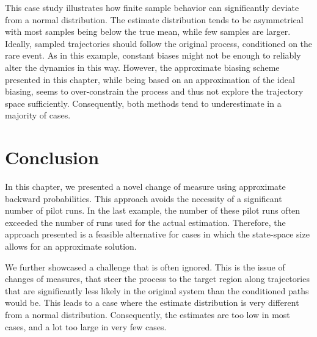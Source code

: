 This case study illustrates how finite sample behavior can significantly deviate from a normal distribution.
The estimate distribution tends to be asymmetrical with most samples being below the true mean, while few samples are larger.
Ideally, sampled trajectories should follow the original process, conditioned on the rare event.
As in this example, constant biases might not be enough to reliably alter the dynamics in this way.
However, the approximate biasing scheme presented in this chapter, while being based on an approximation of the ideal biasing, seems to over-constrain the process and thus not explore the trajectory space sufficiently.
Consequently, both methods tend to underestimate in a majority of cases.

\section{Conclusion}
In this chapter, we presented a novel change of measure using approximate backward probabilities.
This approach avoids the necessity of a significant number of pilot runs.
In the last example, the number of these pilot runs often exceeded the number of runs used for the actual estimation.
Therefore, the approach presented is a feasible alternative for cases in which the state-space size allows for an approximate solution.

We further showcased a challenge that is often ignored.
This is the issue of changes of measures, that steer the process to the target region along trajectories that are significantly less likely in the original system than the conditioned paths would be.
This leads to a case where the estimate distribution is very different from a normal distribution.
Consequently, the estimates are too low in most cases, and a lot too large in very few cases.

